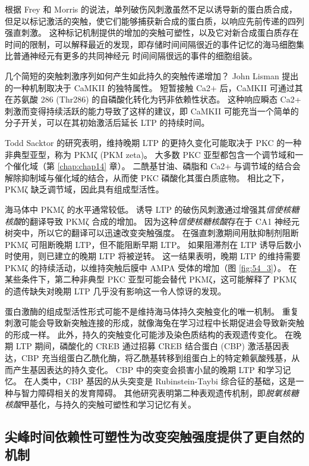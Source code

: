 根据 Frey 和 Morris 的说法，单列破伤风刺激虽然不足以诱导新的蛋白质合成，但足以标记激活的突触，使它们能够捕获新合成的蛋白质，以响应先前传递的四列 强直刺激。
这种标记机制提供的增加的突触可塑性，以及它对新合成蛋白质存在时间的限制，可以解释最近的发现，即存储时间间隔很近的事件记忆的海马细胞集比普通神经元有更多的共同神经元 时间间隔很远的事件的细胞组装。


几个简短的突触刺激序列如何产生如此持久的突触传递增加？
John Lisman 提出的一种机制取决于 CaMKII 的独特属性。
短暂接触 Ca2+ 后，CaMKII 可通过其在苏氨酸 286 (Thr286) 的自磷酸化转化为钙非依赖性状态。
这种响应瞬态 Ca2+ 刺激而变得持续活跃的能力导致了这样的建议，即 CaMKII 可能充当一个简单的分子开关，可以在其初始激活后延长 LTP 的持续时间。


Todd Sacktor 的研究表明，维持晚期 LTP 的更持久变化可能取决于 PKC 的一种非典型亚型，称为 PKMζ (PKM zeta)。
大多数 PKC 亚型都包含一个调节域和一个催化域（第 \ref{chap:chap14} 章）。
二酰基甘油、磷脂和 Ca2+ 与调节域的结合会解除抑制域与催化域的结合，从而使 PKC 磷酸化其蛋白质底物。
相比之下，PKMζ 缺乏调节域，因此具有组成型活性。


海马体中 PKMζ 的水平通常较低。
诱导 LTP 的破伤风刺激通过增强其\textit{信使核糖核酸}的翻译导致 PKMζ 合成的增加。
因为这种\textit{信使核糖核酸}存在于 CA1 神经元树突中，所以它的翻译可以迅速改变突触强度。
在强直刺激期间用肽抑制剂阻断 PKMζ 可阻断晚期 LTP，但不能阻断早期 LTP。
如果阻滞剂在 LTP 诱导后数小时使用，则已建立的晚期 LTP 将被逆转。
这一结果表明，晚期 LTP 的维持需要 PKMζ 的持续活动，以维持突触后膜中 AMPA 受体的增加（图 \ref{fig:54_3}）。
在某些条件下，第二种非典型 PKC 亚型可能会替代 PKMζ，这可能解释了 PKMζ 的遗传缺失对晚期 LTP 几乎没有影响这一令人惊讶的发现。


蛋白激酶的组成型活性形式可能不是维持海马体持久突触变化的唯一机制。
重复刺激可能会导致新突触连接的形成，就像海兔在学习过程中长期促进会导致新突触的形成一样。
此外，持久的突触变化可能涉及染色质结构的表观遗传变化。
在晚期 LTP 期间，磷酸化的 CREB 通过招募 CREB 结合蛋白 (CBP) 激活基因表达，CBP 充当组蛋白乙酰化酶，将乙酰基转移到组蛋白上的特定赖氨酸残基，从而产生基因表达的持久变化。
CBP 中的突变会损害小鼠的晚期 LTP 和学习记忆。
在人类中，CBP 基因的从头突变是 Rubinstein-Taybi 综合征的基础，这是一种与智力障碍相关的发育障碍。
其他研究表明第二种表观遗传机制，即\textit{脱氧核糖核酸}甲基化，与持久的突触可塑性和学习记忆有关。



\subsection{尖峰时间依赖性可塑性为改变突触强度提供了更自然的机制}

